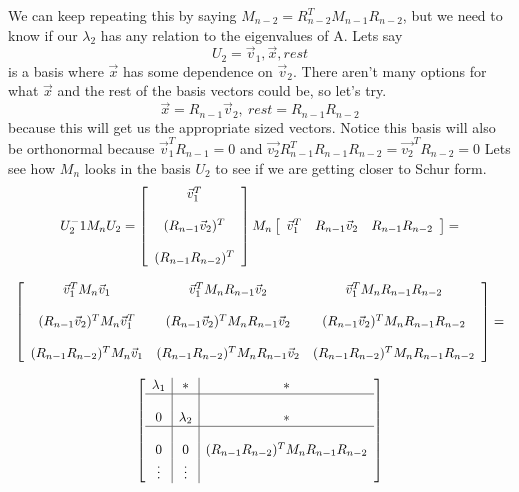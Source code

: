 \documentclass{article}
\begin{document}
We can keep repeating this by saying $M_{n-2} = R_{n-2}^T M_{n-1} R_{n-2}$, but we need to know if our $\lambda_2$ has any relation to the eigenvalues of A.
Lets say $$U_2 = \vec{v}_1, \vec{x}, rest$$ is a basis where $\vec{x}$ has some dependence on $\vec{v}_2$.
There aren't many options for what $\vec{x}$ and the rest of the basis vectors could be, so let's try.
$$\vec{x}=R_{n-1}\vec{v}_2,\ rest = R_{n-1}R_{n-2}$$ because this will get us the appropriate sized vectors.
Notice this basis will also be orthonormal because $\vec{v}_1^T R_{n-1}=0$ and $\vec{v_2}R_{n-1}^TR_{n-1}R_{n-2}=\vec{v_2}^TR_{n-2}=0$
Lets see how $M_n$ looks in the basis $U_2$ to see if we are getting closer to Schur form.
\[
    \begin{array}{c}
        U_2^-1M_nU_2 = 
        \left[
            \begin{array}{c}
                \vec{v}_1^T \\\\
                (R_{n-1}\vec{v}_2)^T\\\\
                (R_{n-1}R_{n-2})^T
            \end{array}
        \right]
        M_n
        \left[
            \begin{array}{ccc}
                \vec{v}_1^T & R_{n-1}\vec{v}_2 & R_{n-1}R_{n-2}
            \end{array}
        \right] = \\\\
        \left[
            \begin{array}{ccc}
                \vec{v}_1^T M_n \vec{v}_1 & \vec{v}_1^T M_n R_{n-1}\vec{v}_2 & \vec{v}_1^T M_n R_{n-1}R_{n-2}\\\\
                (R_{n-1}\vec{v}_2)^T M_n \vec{v}_1^T & (R_{n-1}\vec{v}_2)^T M_n R_{n-1}\vec{v}_2 & (R_{n-1}\vec{v}_2)^T M_n R_{n-1}R_{n-2}\\\\
                (R_{n-1}R_{n-2})^T M_n \vec{v}_1 & (R_{n-1}R_{n-2})^T M_n R_{n-1}\vec{v}_2 & (R_{n-1}R_{n-2})^T M_n R_{n-1}R_{n-2}
            \end{array}
        \right] = \\\\
        \left[
            \begin{array}{c|c|c}
                \lambda_1 & *  & *\\
                \hline & &\\
                0 & \lambda_2 & *\\
                \hline & &\\
                0 & 0 & (R_{n-1}R_{n-2})^T M_n R_{n-1}R_{n-2}\\
                \vdots & \vdots
            \end{array}
        \right]
    \end{array}
\]
\end{document}
